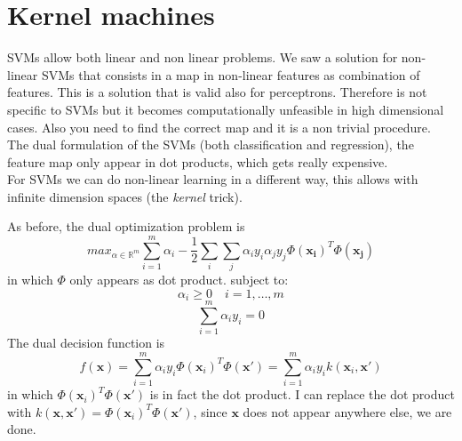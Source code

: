 \chapter{Kernel machines}
\label{cha:kernel_machines}

SVMs allow both linear and non linear problems. We saw a solution for non-linear
SVMs that consists in a map in non-linear features as combination of features.
This is a solution that is valid also for perceptrons. Therefore is not specific
to SVMs but it becomes computationally unfeasible in high dimensional cases.
Also you need to find the correct map and it is a non trivial procedure. The dual
formulation of the SVMs (both classification and regression), the feature map
only appear in dot products, which gets really expensive.\\

For SVMs we can do non-linear learning in a different way, this allows with infinite
dimension spaces (the \textit{kernel} trick).\\


As before, the dual optimization problem is
\[
	max_{\alpha \in \mathbb{R}^m}\sum_{i=1}^{m}\alpha_{i}- \frac{1}{2}\sum_{i}\sum_{j}
	\alpha_{i}y_{i}\alpha_{j}y_{j}\Phi(\pmb{x_i})^{T}\Phi(\pmb{x_j})
\]
in which $\Phi$ only appears as dot product. subject to:
\[
	\alpha_{i}\geq 0 \quad i = 1, \dots, m
\]
\[
	\sum_{i=1}^{m}\alpha_{i}y_{i}= 0
\]
The dual decision function is
\[
	f(\pmb{x}) = \sum_{i=1}^{m}\alpha_{i}y_{i}\Phi(\pmb{x}_{i})^{T}\Phi(\pmb{x'}) =
	\sum_{i=1}^{m}\alpha_{i}y_{i}k(\pmb{x}_{i}, \pmb{x'})
\]
in which $\Phi(\pmb{x}_{i})^{T}\Phi(\pmb{x'})$ is in fact the dot product. I can
replace the dot product with $k(\pmb{x}, \pmb{x'}) = \Phi(\pmb{x}_{i})^{T}\Phi(\pmb
{x'})$, since $\pmb{x}$ does not appear anywhere else, we are done.\\

